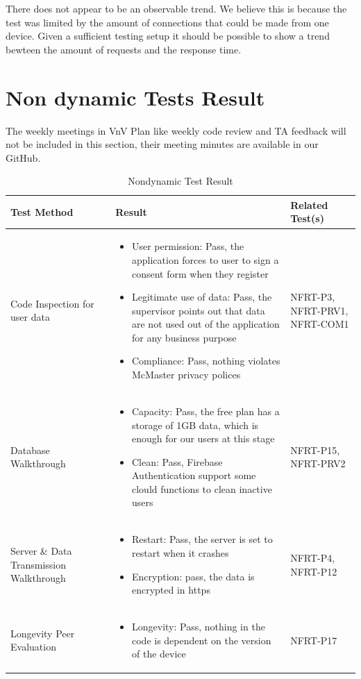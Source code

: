 \documentclass[12pt, titlepage]{article}
\begin{document}
There does not appear to be an observable trend. We believe this is because the test was limited by the amount of connections that could be made from one device.
Given a sufficient testing setup it should be possible to show a trend bewteen the amount of requests and the response time.

\section{Non dynamic Tests Result}\label{static}
The weekly meetings in VnV Plan like weekly code review and TA feedback will not be included in this section, their meeting minutes are available in our GitHub.
\begin{table}[H]
\caption{Nondynamic Test Result}
\begin{tabular}{|p{0.3\linewidth} | p{0.5\linewidth}| p{0.2\linewidth} |}
\hline
\multicolumn{1}{|l}{\bfseries Test Method} & \multicolumn{1}{|l|}{\bfseries Result} & \multicolumn{1}{l|}{\bfseries Related Test(s)}\\
\hline
Code Inspection for user data & 
\begin{itemize}
\item User permission: Pass, the application forces to user to sign a consent form when they register
\item Legitimate use of data: Pass, the supervisor points out that data are not used out of the application for any business purpose
\item Compliance: Pass, nothing violates McMaster privacy polices
\end{itemize} & NFRT-P3, NFRT-PRV1, NFRT-COM1 \\
\hline
Database Walkthrough & 
\begin{itemize}
\item Capacity: Pass, the free plan has a storage of 1GB data, which is enough for our users at this stage
\item Clean: Pass, Firebase Authentication support some clould functions to clean inactive users
\end{itemize}& NFRT-P15, NFRT-PRV2\\
\hline
Server \& Data Transmission Walkthrough & 
\begin{itemize}
\item Restart: Pass, the server is set to restart when it crashes
\item Encryption: pass, the data is encrypted in https
\end{itemize} & NFRT-P4, NFRT-P12 \\
\hline
Longevity Peer Evaluation & 
\begin{itemize}
\item Longevity: Pass, nothing in the code is dependent on the version of the device
\end{itemize} & NFRT-P17\\
\hline
\end{tabular}
\end{table}
\end{document}
